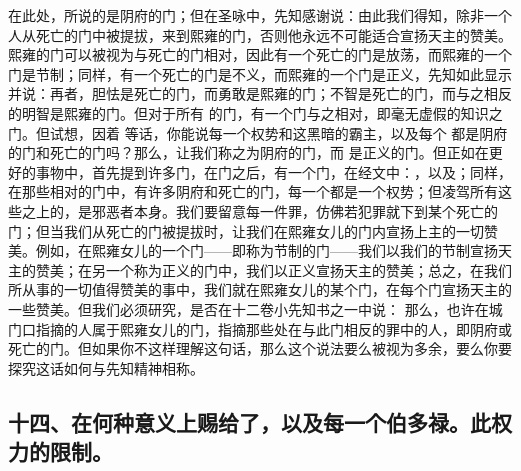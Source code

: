 在此处，所说的是阴府的门；但在圣咏中，先知感谢说：由此我们得知，除非一个人从死亡的门中被提拔，来到熙雍的门，否则他永远不可能适合宣扬天主的赞美。熙雍的门可以被视为与死亡的门相对，因此有一个死亡的门是放荡，而熙雍的一个门是节制；同样，有一个死亡的门是不义，而熙雍的一个门是正义，先知如此显示并说：再者，胆怯是死亡的门，而勇敢是熙雍的门；不智是死亡的门，而与之相反的明智是熙雍的门。但对于所有 的门，有一个门与之相对，即毫无虚假的知识之门。但试想，因着 等话，你能说每一个权势和这黑暗的霸主，以及每个 都是阴府的门和死亡的门吗？那么，让我们称之为阴府的门，而 是正义的门。但正如在更好的事物中，首先提到许多门，在门之后，有一个门，在经文中：，以及；同样，在那些相对的门中，有许多阴府和死亡的门，每一个都是一个权势；但凌驾所有这些之上的，是邪恶者本身。我们要留意每一件罪，仿佛若犯罪就下到某个死亡的门；但当我们从死亡的门被提拔时，让我们在熙雍女儿的门内宣扬上主的一切赞美。例如，在熙雍女儿的一个门——即称为节制的门——我们以我们的节制宣扬天主的赞美；在另一个称为正义的门中，我们以正义宣扬天主的赞美；总之，在我们所从事的一切值得赞美的事中，我们就在熙雍女儿的某个门，在每个门宣扬天主的一些赞美。但我们必须研究，是否在十二卷小先知书之一中说： 那么，也许在城门口指摘的人属于熙雍女儿的门，指摘那些处在与此门相反的罪中的人，即阴府或死亡的门。但如果你不这样理解这句话，那么这个说法要么被视为多余，要么你要探究这话如何与先知精神相称。\par


\subsection{十四、在何种意义上赐给了，以及每一个伯多禄。此权力的限制。}

